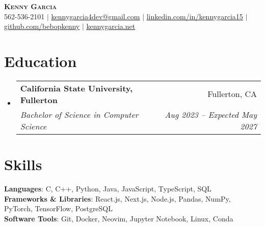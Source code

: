 \documentclass[letterpaper,11pt]{article}
\makeatletter
\newcommand{\resumeSubheading}[4]{
  \vspace{-2pt}\item
    \begin{tabular*}{0.97\textwidth}[t]{l@{\extracolsep{\fill}}r}
      \textbf{#1} & #2 \\
      \textit{\small#3} & \textit{\small #4} \\
    \end{tabular*}\vspace{-7pt}
}
\newcommand{\resumeSubHeadingListStart}{\begin{itemize}[leftmargin=0.15in, label={}]}
\newcommand{\resumeSubHeadingListEnd}{\end{itemize}}
\makeatother
\begin{document}

\begin{center}
    \textbf{\Huge \scshape Kenny Garcia} \\ \vspace{1pt}
    \small 562-536-2101 $|$ \href{https://www.kennygarcia4dev@gmail.com}{\underline{kennygarcia4dev@gmail.com}} $|$ 
    \href{https://linkedin.com/in/kennygarcia15}{\underline{linkedin.com/in/kennygarcia15}} $|$
    \href{https://github.com/bebopkenny}{\underline{github.com/bebopkenny}} $|$ \href{https://kennygarcia.net}{\underline{kennygarcia.net}}
\end{center}


\section{Education}
  \resumeSubHeadingListStart
    \resumeSubheading
      {California State University, Fullerton}{Fullerton, CA}
      {Bachelor of Science in Computer Science}{Aug 2023 -- Expected May 2027}
  \resumeSubHeadingListEnd
\vspace{-8pt}


\section{Skills}
 \begin{itemize}[leftmargin=0.15in, label={}]
    \small{\item{
     \textbf{Languages}{: C, C++, Python, Java, JavaScript, TypeScript, SQL} \\
     \textbf{Frameworks \& Libraries}{: React.js, Next.js, Node.js, Pandas, NumPy, PyTorch, TensorFlow, PostgreSQL} \\
     \textbf{Software Tools}{: Git, Docker, Neovim, Jupyter Notebook, Linux, Conda}
    }}
 \end{itemize}
\end{document}
